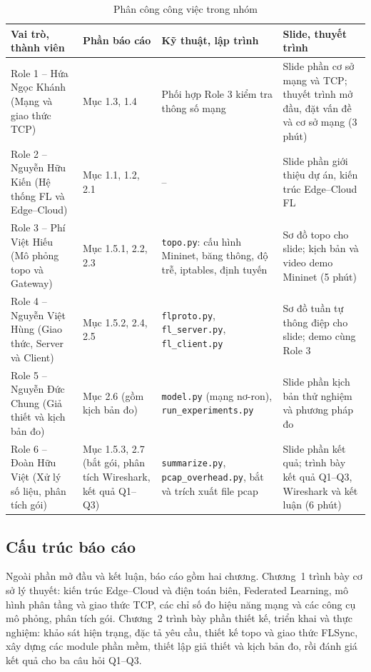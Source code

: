 \begingroup
\setcounter{table}{0}%
\renewcommand{\thetable}{\textit{\fontsize{12pt}{0}\selectfont \arabic{table}}}
\begin{table}[H]
    \centering
    \caption{Phân công công việc trong nhóm}
    \label{tab:assign}
    \small
    \begin{tabularx}{\textwidth}{>{\raggedright\arraybackslash}p{3.2cm} >{\raggedright\arraybackslash\hsize=0.75\hsize}X >{\raggedright\arraybackslash\hsize=1.2\hsize}X >{\raggedright\arraybackslash\hsize=1.05\hsize}X}
        \toprule
        \textbf{Vai trò, thành viên} & \textbf{Phần báo cáo} & \textbf{Kỹ thuật, lập trình} & \textbf{Slide, thuyết trình} \\
        \midrule
        Role 1 -- Hứa Ngọc Khánh (Mạng và giao thức TCP) & Mục 1.3, 1.4 & Phối hợp Role 3 kiểm tra thông số mạng & Slide phần cơ sở mạng và TCP; thuyết trình mở đầu, đặt vấn đề và cơ sở mạng (3 phút) \\
        \midrule
        Role 2 -- Nguyễn Hữu Kiến (Hệ thống FL và Edge--Cloud) & Mục 1.1, 1.2, 2.1 & -- & Slide phần giới thiệu dự án, kiến trúc Edge--Cloud FL \\
        \midrule
        Role 3 -- Phí Việt Hiếu (Mô phỏng topo và Gateway) & Mục 1.5.1, 2.2, 2.3 & \texttt{topo.py}: cấu hình Mininet, băng thông, độ trễ, iptables, định tuyến & Sơ đồ topo cho slide; kịch bản và video demo Mininet (5 phút) \\
        \midrule
        Role 4 -- Nguyễn Việt Hùng (Giao thức, Server và Client) & Mục 1.5.2, 2.4, 2.5 & \texttt{flproto.py}, \texttt{fl\_server.py}, \texttt{fl\_client.py} & Sơ đồ tuần tự thông điệp cho slide; demo cùng Role 3 \\
        \midrule
        Role 5 -- Nguyễn Đức Chung (Giả thiết và kịch bản đo) & Mục 2.6 (gồm kịch bản đo) & \texttt{model.py} (mạng nơ-ron), \texttt{run\_experiments.py} & Slide phần kịch bản thử nghiệm và phương pháp đo \\
        \midrule
        Role 6 -- Đoàn Hữu Việt (Xử lý số liệu, phân tích gói) & Mục 1.5.3, 2.7 (bắt gói, phân tích Wireshark, kết quả Q1--Q3) & \texttt{summarize.py}, \texttt{pcap\_overhead.py}, bắt và trích xuất file pcap & Slide phần kết quả; trình bày kết quả Q1--Q3, Wireshark và kết luận (6 phút) \\
        \bottomrule
    \end{tabularx}
\end{table}
\endgroup

\subsection*{Cấu trúc báo cáo}
Ngoài phần mở đầu và kết luận, báo cáo gồm hai chương. Chương~1 trình bày cơ sở lý thuyết: kiến trúc Edge--Cloud và điện toán biên, Federated Learning, mô hình phân tầng và giao thức TCP, các chỉ số đo hiệu năng mạng và các công cụ mô phỏng, phân tích gói. Chương~2 trình bày phần thiết kế, triển khai và thực nghiệm: khảo sát hiện trạng, đặc tả yêu cầu, thiết kế topo và giao thức FLSync, xây dựng các module phần mềm, thiết lập giả thiết và kịch bản đo, rồi đánh giá kết quả cho ba câu hỏi Q1--Q3.

\cleardoublepage
